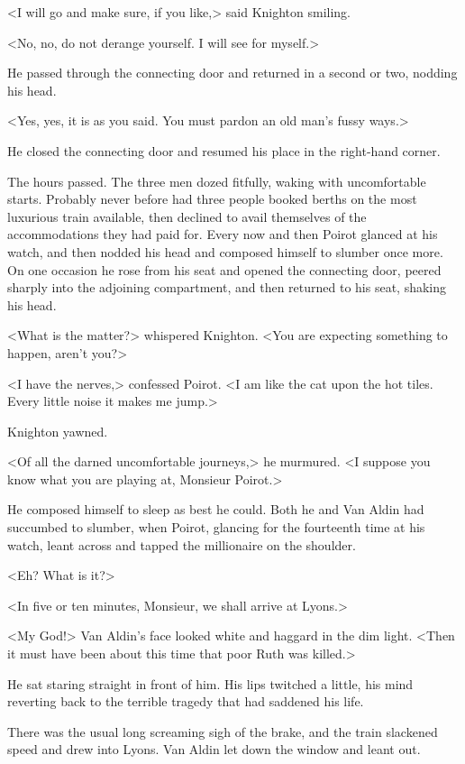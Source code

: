 <I will go and make sure, if you like,> said Knighton smiling.

<No, no, do not derange yourself. I will see for myself.>

He passed through the connecting door and returned in a second or two, nodding his head.

<Yes, yes, it is as you said. You must pardon an old man's fussy ways.>

He closed the connecting door and resumed his place in the right-hand corner.

The hours passed. The three men dozed fitfully, waking with uncomfortable starts. Probably never before had three people booked berths on the most luxurious train available, then declined to avail themselves of the accommodations they had paid for. Every now and then Poirot glanced at his watch, and then nodded his head and composed himself to slumber once more. On one occasion he rose from his seat and opened the connecting door, peered sharply into the adjoining compartment, and then returned to his seat, shaking his head.

<What is the matter?> whispered Knighton. <You are expecting something to happen, aren't you?>

<I have the nerves,> confessed Poirot. <I am like the cat upon the hot tiles. Every little noise it makes me jump.>

Knighton yawned.

<Of all the darned uncomfortable journeys,> he murmured. <I suppose you know what you are playing at, Monsieur Poirot.>

He composed himself to sleep as best he could. Both he and Van Aldin had succumbed to slumber, when Poirot, glancing for the fourteenth time at his watch, leant across and tapped the millionaire on the shoulder.

<Eh? What is it?>

<In five or ten minutes, Monsieur, we shall arrive at Lyons.>

<My God!> Van Aldin's face looked white and haggard in the dim light. <Then it must have been about this time that poor Ruth was killed.>

He sat staring straight in front of him. His lips twitched a little, his mind reverting back to the terrible tragedy that had saddened his life.

There was the usual long screaming sigh of the brake, and the train slackened speed and drew into Lyons. Van Aldin let down the window and leant out.

